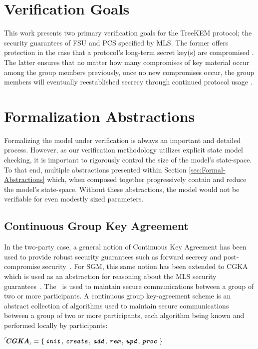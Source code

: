 \documentclass[runningheads]{llncs}
\newcommand{\Abrev}[1]{\gls{#1}}
\begin{document}
{%
\section{Verification Goals}\label{sec:forward-secrecy-with-updates}}

This work presents two primary verification goals for the TreeKEM protocol; the security guarantees of \Abrev{FSU} and  \Abrev{PCS} specified by \Abrev{MLS}.
The former offers protection in the case that a protocol's long-term secret key(s) are compromised \cite{boyd2021modern}.
The latter ensures that no matter how many compromises of key material occur among the group members previously, once no new compromises occur, the group members will eventually reestablished secrecy through continued protocol usage \cite{alwen2020security}.\\[-1mm]



\section{Formalization Abstractions\label{sec:Formal-Abstractions}}

Formalizing the model under verification is always an important and detailed process.
However, as our verification methodology utilizes explicit state model checking, it is important to rigorously control the size of the model's state-space.  
To that end, multiple abstractions presented within Section \ref{sec:Formal-Abstractions} which, when composed together progressively contain and reduce the model's state-space.
Without these abstractions, the model would not be verifiable for even modestly sized parameters.

\subsection{Continuous Group Key Agreement}

In the two-party case, a general notion of Continuous Key Agreement has been used to provide robust security guarantees such as forward secrecy and post-compromise security~\cite{alwen2019double}.
For \Abrev{SGM}, this same notion has been extended to \Abrev{CGKA} which is used as an abstraction for reasoning about the \Abrev{MLS} security guarantees~\cite{alwen2020security}.
The  \CGKAdef\ is used to maintain secure communications between a group of two or more participants.
A continuous group key-agreement scheme is an abstract collection of algorithms used to maintain secure communications between a group of two or more participants, each algorithm being known and performed locally by participants:\\[2mm]
\centerline{${}^{\ulcorner}\!\!\textbf{\textit{CGKA}}_{\!\lrcorner} = \left\{\,\texttt{\textit{init}},\, \texttt{\textit{create}},\, \texttt{\textit{add}},\, \texttt{\textit{rem}},\, \texttt{\textit{upd}},\, \texttt{\textit{proc}}\,\right\}$}\\[-3mm]
\end{document}
